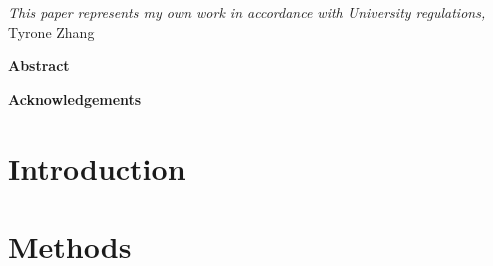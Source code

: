 \documentclass[11pt]{report}
\begin{document}



\thispagestyle{empty}
\vspace*{3in}
\begin{center}
\emph{This paper represents my own work in accordance with University regulations,} \\
Tyrone Zhang %
\end{center}
\clearpage

\begin{center}
\Large \textbf{Abstract}
\end{center}
 
 \clearpage

\begin{center}
\Large \textbf{Acknowledgements}
\end{center}

\clearpage

\thispagestyle{empty}
\tableofcontents
\clearpage

\listoffigures 
\listoftables
\clearpage

\fancyhead{}
\fancyfoot{}
\pagestyle{fancyplain}

{\newpage\renewcommand{\thepage}{\arabic{page}}\setcounter{page}{1}}


\section{Introduction \label{sec:introduction}}

% 

\section{Methods \label{sec:methods}}
\end{document}
